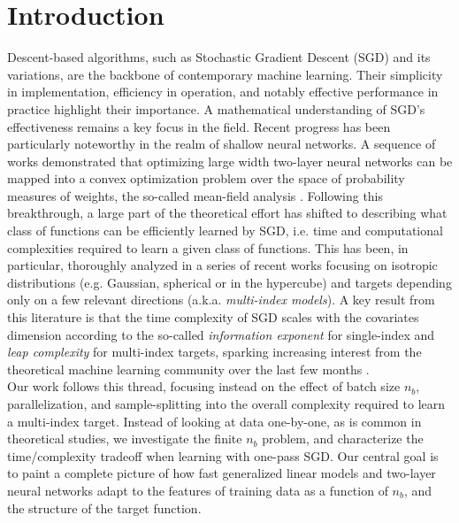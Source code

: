\section{Introduction}
\label{2406:sec:main:introduction}

Descent-based algorithms, such as Stochastic Gradient Descent (SGD) and its variations, are the backbone of contemporary machine learning. Their simplicity in implementation, efficiency in operation, and notably effective performance in practice highlight their importance. A mathematical understanding of SGD's effectiveness remains a key focus in the field. Recent progress has been particularly noteworthy in the realm of shallow neural networks. A sequence of works demonstrated that optimizing large width two-layer neural networks can be mapped into a convex optimization problem over the space of probability measures of weights, the so-called mean-field analysis \citep{mei2018mean,chizat2018global,rotskoff2022trainability,sirignano2020mean}. 
Following this breakthrough, a large part of the theoretical effort has shifted to describing what class of functions can be efficiently learned by SGD, i.e. time and computational complexities required to learn a given class of functions. This has been, in particular, 
thoroughly analyzed in a series of recent works focusing on isotropic distributions (e.g. Gaussian, spherical or in the hypercube) and targets depending only on a few relevant directions (a.k.a. \emph{multi-index models}). A key result from this literature is that the time complexity of SGD scales with the covariates dimension according to the so-called \emph{information exponent} \citep{arous2021online} for single-index and \emph{leap complexity} \citep{abbe2021staircase,abbe2023sgd} for multi-index targets, sparking increasing interest from the theoretical machine learning community over the last few months \citep{damian2022neural,damian2023smoothing,dandi2023how,bietti2023learning,ba2023learning,moniri2023theory,mousavihosseini2023gradient,zweig2023symmetric}. \\
Our work follows this thread, focusing instead on the effect of batch size $n_b$, parallelization, and sample-splitting into the overall complexity required to learn a multi-index target. Instead of looking at data one-by-one, as is common in theoretical studies, we investigate the finite $n_b$ problem, and characterize the time/complexity tradeoff when learning with one-pass SGD. 
Our central goal is to paint a complete picture 
of how fast generalized linear models and two-layer neural networks adapt to the features of training data as a function of $n_b$, and the structure of the target function. 

